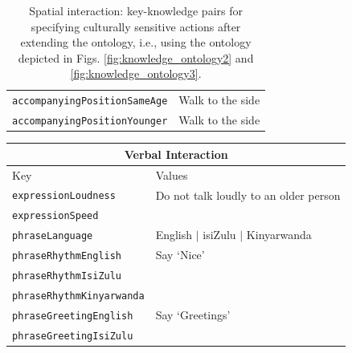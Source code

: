 \documentclass{CSSRforAfrica}
\begin{document}
\begin{table}[H]
\begin{center}
\begin{tabular}{|l l|}
{\footnotesize \verb+accompanyingPositionSameAge+}  & {\footnotesize \verb++ Walk to the side} \vspace{-1mm}\\
{\footnotesize \verb+accompanyingPositionYounger+}  & {\footnotesize \verb++ Walk to the side} \\
\hline \hline
\end{tabular}
\end{center}
\caption{Spatial interaction: key-knowledge pairs for specifying culturally sensitive actions after extending the ontology, i.e., using the ontology depicted in Figs. \ref{fig:knowledge_ontology2} and \ref{fig:knowledge_ontology3}.}
\label{table:key-knowledge_pairs1}
\end{table}

 
\begin{table}[H]
\begin{center}
\begin{tabular}{|l l|}
\hline \hline
\multicolumn{2}{|c|}{{\small \bf Verbal Interaction}} \\
\hline \hline
 {\small  Key  }                                         &  {\small Values }      \\
\hline
{\footnotesize \verb+expressionLoudness+} 	           & {\footnotesize   Do not talk loudly to an older person} \vspace{-1mm}\\
{\footnotesize \verb+expressionSpeed+} 	           & {\footnotesize  }  \vspace{-1mm}\\
{\footnotesize \verb+phraseLanguage+}    & {\footnotesize   English  $|$ isiZulu $|$   Kinyarwanda } \vspace{-1mm}\\
{\footnotesize \verb+phraseRhythmEnglish+}     & {\footnotesize    Say `Nice'}\vspace{-1mm}\\
{\footnotesize \verb+phraseRhythmIsiZulu+}     & {\footnotesize  }\vspace{-1mm}\\
{\footnotesize \verb+phraseRhythmKinyarwanda+}     & {\footnotesize }\vspace{-1mm}\\
{\footnotesize \verb+phraseGreetingEnglish+}     & {\footnotesize   Say  `Greetings'}\vspace{-1mm}\\
{\footnotesize \verb+phraseGreetingIsiZulu+}     & {\footnotesize   }\vspace{-1mm}\\

\end{tabular}
\end{center}
\end{table}
\end{document}
